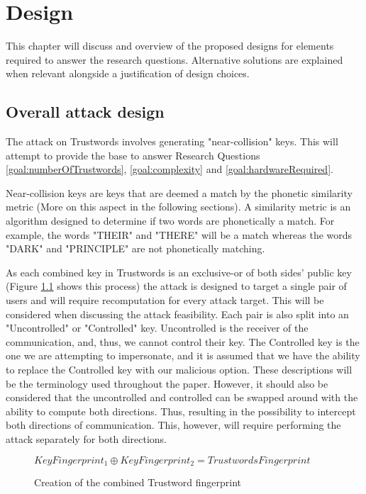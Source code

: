 \chapter{Design}
\label{cha:Design}

This chapter will discuss and overview of the proposed designs for elements required to answer the research questions. Alternative solutions are explained when relevant alongside a justification of design choices.

\section{Overall attack design}

The attack on Trustwords involves generating "near-collision" keys. 
This will attempt to provide the base to answer Research Questions \ref{goal:numberOfTrustwords}, \ref{goal:complexity} and \ref{goal:hardwareRequired}.

Near-collision keys are keys that are deemed a match by the phonetic similarity metric (More on this aspect in the following sections). A similarity metric is an algorithm designed to determine if two words are phonetically a match. For example, the words "THEIR" and "THERE" will be a match whereas the words "DARK" and "PRINCIPLE" are not phonetically matching.

As each combined key in Trustwords is an exclusive-or of both sides' public key (Figure \ref{fig:xor_trustwords} shows this process) the attack is designed to target a single pair of users and will require recomputation for every attack target. This will be considered when discussing the attack feasibility. Each pair is also split into an "Uncontrolled" or "Controlled" key. Uncontrolled is the receiver of the communication, and, thus, we cannot control their key. The Controlled key is the one we are attempting to impersonate, and it is assumed that we have the ability to replace the Controlled key with our malicious option. These descriptions will be the terminology used throughout the paper. However, it should also be considered that the uncontrolled and controlled can be swapped around with the ability to compute both directions. Thus, resulting in the possibility to intercept both directions of communication. This, however, will require performing the attack separately for both directions.

\begin{figure}[h!]
    \centering
    $KeyFingerprint_{1} \oplus KeyFingerprint_{2} = TrustwordsFingerprint$
    \caption{Creation of the combined Trustword fingerprint}
    \label{fig:xor_trustwords}
\end{figure}

